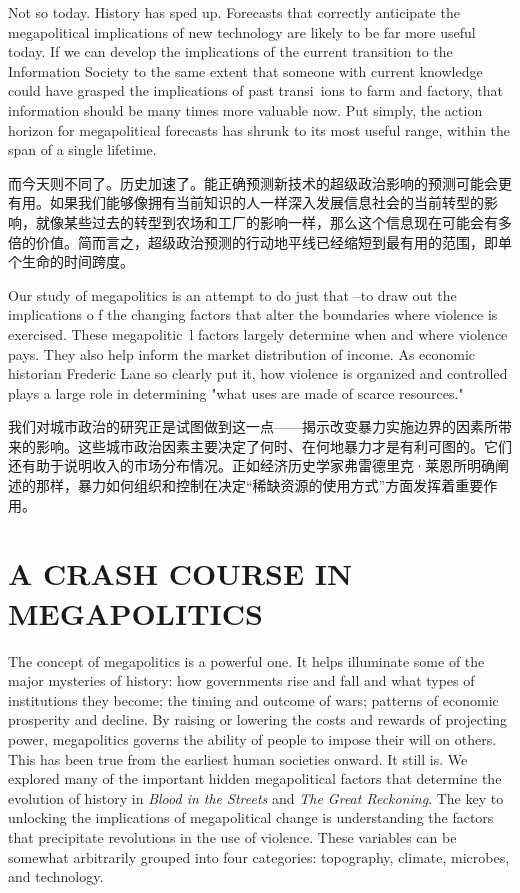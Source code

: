 \begin{Parallel}{97mm}{45mm}
  \ParallelLText
  {Not so today. History has sped up. Forecasts that correctly anticipate the megapolitical implications of new technology are likely to be far more useful today. If we can develop the implications of the current transition to the Information Society to the same extent that someone with current knowledge could have grasped the implications of past transi~ions to farm and factory, that information should be many times more valuable now. Put simply, the action horizon for megapolitical forecasts has shrunk to its most useful range, within the span of a single lifetime.}
  
  \ParallelRText
  {而今天则不同了。历史加速了。能正确预测新技术的超级政治影响的预测可能会更有用。如果我们能够像拥有当前知识的人一样深入发展信息社会的当前转型的影响，就像某些过去的转型到农场和工厂的影响一样，那么这个信息现在可能会有多倍的价值。简而言之，超级政治预测的行动地平线已经缩短到最有用的范围，即单个生命的时间跨度。}
  \ParallelPar


  \ParallelLText
  {Our study of megapolitics is an attempt to do just that --to draw out the implications o f the changing factors that alter the boundaries where violence is exercised. These megapolitic~l factors largely determine when and where violence pays. They also help inform the market distribution of income. As economic historian Frederic Lane so clearly put it, how violence is organized and controlled plays a large role in determining "what uses are made of scarce resources." }
  
  \ParallelRText
  {我们对城市政治的研究正是试图做到这一点——揭示改变暴力实施边界的因素所带来的影响。这些城市政治因素主要决定了何时、在何地暴力才是有利可图的。它们还有助于说明收入的市场分布情况。正如经济历史学家弗雷德里克·莱恩所明确阐述的那样，暴力如何组织和控制在决定“稀缺资源的使用方式”方面发挥着重要作用。}
  \ParallelPar

  \section{A CRASH COURSE IN MEGAPOLITICS}

  \ParallelLText
  {The concept of megapolitics is a powerful one. It helps illuminate some of the major mysteries of history: how governments rise and fall and what types of institutions they become; the timing and outcome of wars; patterns of economic prosperity and decline. By raising or lowering the costs and rewards of projecting power, megapolitics governs the ability of people to impose their will on others. This has been true from the earliest human societies onward. It still is. We explored many of the important hidden megapolitical factors that determine the evolution of history in \emph{Blood in the Streets} and \emph{The Great Reckoning}. The key to unlocking the implications of megapolitical change is understanding the factors that precipitate revolutions in the use of violence. These variables can be somewhat arbitrarily grouped into four categories: topography, climate, microbes, and technology.}
  

\end{Parallel}
